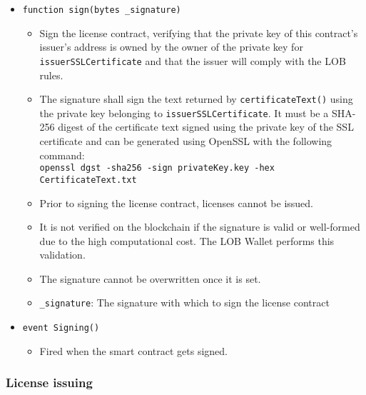 \documentclass[a4paper]{article}
\begin{document}
\begin{itemize}
  \item \texttt{function sign(bytes \_signature)}
  \begin{itemize}
    \item Sign the license contract, verifying that the private key of this contract's issuer's address is owned by the owner of the private key for \texttt{issuerSSLCertificate} and that the issuer will comply with the LOB rules.
    \item The signature shall sign the text returned by \texttt{certificateText()} using the private key belonging to \texttt{issuerSSLCertificate}. It must be a SHA-256 digest of the certificate text signed using the private key of the SSL certificate and can be generated using OpenSSL with the following command: \\\texttt{openssl dgst -sha256 -sign privateKey.key -hex CertificateText.txt}
    \item Prior to signing the license contract, licenses cannot be issued.
    \item It is not verified on the blockchain if the signature is valid or well-formed due to the high computational cost. The LOB Wallet performs this validation.
    \item The signature cannot be overwritten once it is set.
    \item \texttt{\_signature}: The signature with which to sign the license contract
  \end{itemize}
  
  \item \texttt{event Signing()}
  \begin{itemize}
    \item Fired when the smart contract gets signed.
  \end{itemize}
\end{itemize}

\subsubsection{License issuing}
\end{document}
